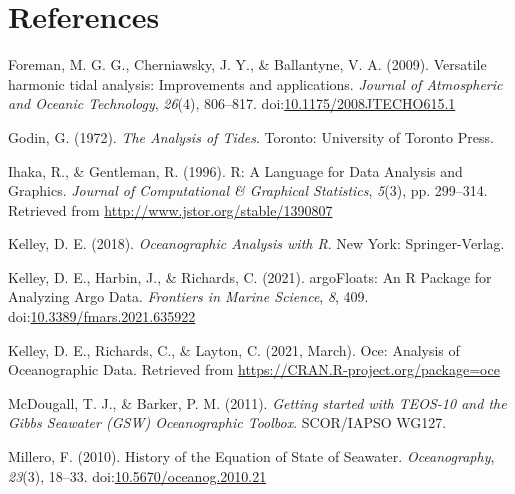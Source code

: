\documentclass[10pt,a4paper,onecolumn]{article}
\newlength{\cslhangindent}
\newenvironment{CSLReferences}[3] %
 {%
  \setlength{\parindent}{0pt}
  \ifodd #1 \everypar{\setlength{\hangindent}{\cslhangindent}}\ignorespaces\fi
  \ifnum #2 > 0
  \setlength{\parskip}{#2\baselineskip}
  \fi
 }%
 {}
\begin{document}
\hypertarget{references}{%
\section*{References}\label{references}}

\hypertarget{refs}{}
\begin{CSLReferences}{1}{0}
\leavevmode{}%
Foreman, M. G. G., Cherniawsky, J. Y., \& Ballantyne, V. A. (2009).
Versatile harmonic tidal analysis: {Improvements} and applications.
\emph{Journal of Atmospheric and Oceanic Technology}, \emph{26}(4),
806--817.
doi:\href{https://doi.org/10.1175/2008JTECHO615.1}{10.1175/2008JTECHO615.1}

\leavevmode{}%
Godin, G. (1972). \emph{The {Analysis} of {Tides}}. Toronto: University
of Toronto Press.

\leavevmode{}%
Ihaka, R., \& Gentleman, R. (1996). R: {A} {Language} for {Data}
{Analysis} and {Graphics}. \emph{Journal of Computational \& Graphical
Statistics}, \emph{5}(3), pp. 299--314. Retrieved from
\url{http://www.jstor.org/stable/1390807}

\leavevmode{}%
Kelley, D. E. (2018). \emph{Oceanographic {Analysis} with {R}}. New
York: Springer-Verlag.

\leavevmode{}%
Kelley, D. E., Harbin, J., \& Richards, C. (2021). {argoFloats}: {An}
{R} {Package} for {Analyzing} {Argo} {Data}. \emph{Frontiers in Marine
Science}, \emph{8}, 409.
doi:\href{https://doi.org/10.3389/fmars.2021.635922}{10.3389/fmars.2021.635922}

\leavevmode{}%
Kelley, D. E., Richards, C., \& Layton, C. (2021, March). Oce:
{Analysis} of {Oceanographic} {Data}. Retrieved from
\url{https://CRAN.R-project.org/package=oce}

\leavevmode{}%
McDougall, T. J., \& Barker, P. M. (2011). \emph{Getting started with
{TEOS}-10 and the {Gibbs} {Seawater} ({GSW}) {Oceanographic} {Toolbox}}.
SCOR/IAPSO WG127.

\leavevmode{}%
Millero, F. (2010). History of the {Equation} of {State} of {Seawater}.
\emph{Oceanography}, \emph{23}(3), 18--33.
doi:\href{https://doi.org/10.5670/oceanog.2010.21}{10.5670/oceanog.2010.21}


\end{CSLReferences}
\end{document}
